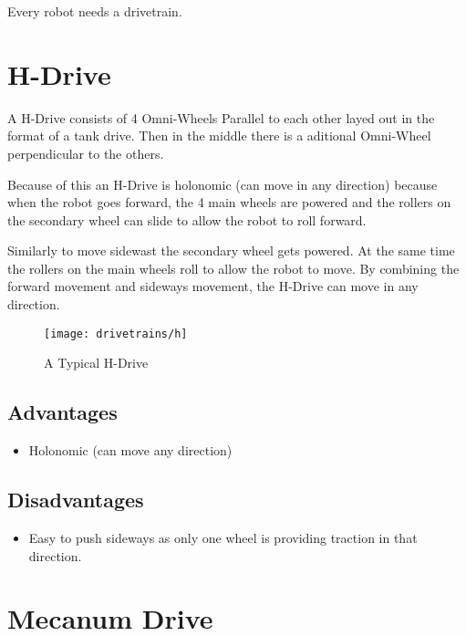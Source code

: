 \documentclass[../../main.tex]{subfiles}
\begin{document}
Every robot needs a drivetrain.

\section{H-Drive}

A H-Drive consists of 4 Omni-Wheels Parallel to each other layed out in the format of a tank drive.
Then in the middle there is a aditional Omni-Wheel perpendicular to the others.
\par

Because of this an H-Drive is holonomic (can move in any direction) because when the robot goes forward, the 4 main wheels are powered and the rollers on the secondary wheel can slide to allow the robot to roll forward.
\par

Similarly to move sidewast the secondary wheel gets powered.
At the same time the rollers on the main wheels roll to allow the robot to move.
By combining the forward movement and sideways movement, the H-Drive can move in any direction.

\begin{figure}[h]
	\centering

	\texttt{[image: drivetrains/h]}
	\caption{A Typical H-Drive}
	\label{fig:drivetrainh}
\end{figure}

\subsection{Advantages}

\begin{itemize}
	\item Holonomic (can move any direction)
\end{itemize}

\subsection{Disadvantages}

\begin{itemize}
	\item Easy to push sideways as only one wheel is providing
	      traction in that direction.
\end{itemize}

\section{Mecanum Drive}
\end{document}
